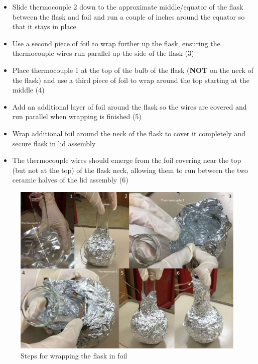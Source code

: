 \documentclass[letterpaper,11pt]{article}
\begin{document}
\begin{itemize}
\begin{itemize}
\begin{itemize}
                \item Slide thermocouple 2 down to the approximate 
                    middle/equator of the flask between the flask and foil and run
                    a couple of inches around the equator so that it stays in place  
                \item Use a second piece of foil to wrap further up the flask, 
                    ensuring the thermocouple wires run parallel up the side of 
                    the flask (3)
                \item Place thermocouple 1 at the top of the bulb of the flask 
                    (\textbf{NOT} on the neck of the flask) and use a third 
                    piece of foil to wrap around the top starting at the 
                    middle (4)
                \item Add an additional layer of foil around  the flask so the 
                    wires are covered and run parallel when wrapping is finished
                    (5)
                \item Wrap additional foil around the neck of the flask to cover 
                    it completely and secure flask in lid assembly
                \item The thermocouple wires should emerge from the foil 
                    covering near the top (but not at the top) of the flask 
                    neck, allowing them to run between the two ceramic halves of
                    the lid assembly (6)
                \end{itemize}

\begin{figure}[H]
\centering
\includegraphics[width=1\textwidth]{wrap.jpg}
\caption{Steps for wrapping the flask in foil}
\label{fig:wrap}
\end{figure}


\end{itemize}
\end{itemize}
\end{document}
